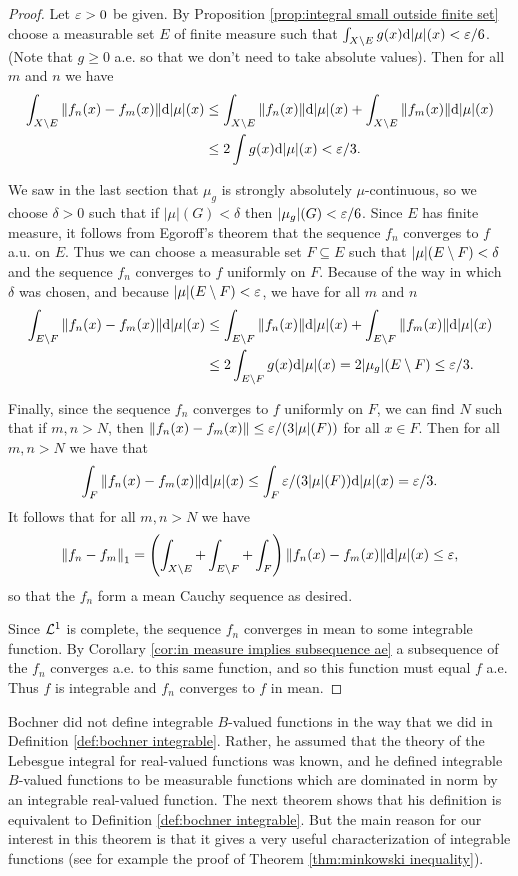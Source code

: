 \begin{proof}
Let $\varepsilon>0$ be given. By Proposition \ref{prop:integral small outside finite set} choose a measurable set $E$ of finite measure such that $\int_{X\setminus E}g(x)\dd|\mu|(x)<\varepsilon/6$. (Note that $g \geq 0$ a.e. so that we don't need to take absolute values). Then for all $m$ and $n$ we have
\begin{align*}
    \int_{X\setminus E}\norm{f_n(x)-f_m(x)}\dd|\mu|(x)&\leq\int_{X\setminus E}\norm{f_n(x)}\dd|\mu|(x)+\int_{X\setminus E}\norm{f_m(x)}\dd|\mu|(x)\\
    &\leq2\int g(x)\dd|\mu|(x)<\varepsilon/3.
\end{align*}

We saw in the last section that $\mu_g$ is strongly absolutely $\mu$-continuous, so we choose $\delta>0$ such that if $|\mu|(G)<\delta$ then $|\mu_g|(G)<\varepsilon/6$. Since $E$ has finite measure, it follows from Egoroff's theorem that the sequence $f_n$ converges to $f$ a.u. on $E$. Thus we can choose a measurable set $F\subseteq E$ such that $|\mu|(E\setminus F)<\delta$ and the sequence $f_n$ converges to $f$ uniformly on $F$. Because of the way in which $\delta$ was chosen, and because $|\mu|(E\setminus F)<\varepsilon$, we have for all $m$ and $n$ 
\begin{align*}
    \int_{E\setminus F}\norm{f_n(x)-f_m(x)}\dd|\mu|(x)&\leq\int_{E\setminus F}\norm{f_n(x)}\dd|\mu|(x)+\int_{E\setminus F}\norm{f_m(x)}\dd|\mu|(x)\\
    &\leq2\int_{E\setminus F}g(x)\dd|\mu|(x)=2|\mu_g|(E\setminus F)\leq\varepsilon/3.
\end{align*}

Finally, since the sequence $f_n$ converges to $f$ uniformly on $F$, we can find $N$ such that if $m,n>N$, then $\norm{f_n(x)-f_m(x)}\leq\varepsilon/(3|\mu|(F))$ for all $x\in F$. Then for all $m,n>N$ we have that \[\int_F\norm{f_n(x)-f_m(x)}\dd|\mu|(x)\leq\int_F\varepsilon/(3|\mu|(F))\dd|\mu|(x)=\varepsilon/3.\] It follows that for all $m,n>N$ we have \[\norm{f_n-f_m}_1=\left(\int_{X\setminus E}+\int_{E\setminus F}+\int_F\right)\norm{f_n(x)-f_m(x)}\dd|\mu|(x)\leq\varepsilon,\] so that the $f_n$ form a mean Cauchy sequence as desired.

Since ${\cal L}^1$ is complete, the sequence $f_n$ converges in mean to some integrable function. By Corollary \ref{cor:in measure implies subsequence ae} a subsequence of the $f_n$ converges a.e. to this same function, and so this function must equal $f$ a.e. Thus $f$ is integrable and $f_n$ converges to $f$ in mean.
\end{proof}

Bochner did not define integrable $B$-valued functions in the way that we did in Definition \ref{def:bochner integrable}. Rather, he assumed that the theory of the Lebesgue integral for real-valued functions was known, and he defined integrable $B$-valued functions to be measurable functions which are dominated in norm by an integrable real-valued function. The next theorem shows that his definition is equivalent to Definition \ref{def:bochner integrable}. But the main reason for our interest in this theorem is that it gives a very useful characterization of integrable functions (see for example the proof of Theorem \ref{thm:minkowski inequality}).

